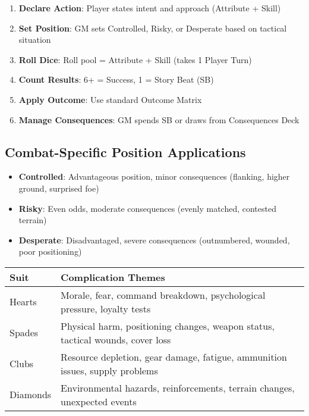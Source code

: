 \begin{enumerate}
    \item \textbf{Declare Action}: Player states intent and approach (Attribute + Skill)
    \item \textbf{Set Position}: GM sets Controlled, Risky, or Desperate based on tactical situation
    \item \textbf{Roll Dice}: Roll pool = Attribute + Skill (takes 1 Player Turn)
    \item \textbf{Count Results}: 6+ = Success, 1 = Story Beat (SB)
    \item \textbf{Apply Outcome}: Use standard Outcome Matrix
    \item \textbf{Manage Consequences}: GM spends SB or draws from Consequences Deck
\end{enumerate}

\subsection{Combat-Specific Position Applications}

\begin{itemize}
    \item \textbf{Controlled}: Advantageous position, minor consequences (flanking, higher ground, surprised foe)
    \item \textbf{Risky}: Even odds, moderate consequences (evenly matched, contested terrain)
    \item \textbf{Desperate}: Disadvantaged, severe consequences (outnumbered, wounded, poor positioning)
\end{itemize}

\begin{fatebox}
\begin{tabularx}{\textwidth}{lX}
\toprule
\textbf{Suit} & \textbf{Complication Themes} \\
\midrule
Hearts & Morale, fear, command breakdown, psychological pressure, loyalty tests \\
Spades & Physical harm, positioning changes, weapon status, tactical wounds, cover loss \\
Clubs & Resource depletion, gear damage, fatigue, ammunition issues, supply problems \\
Diamonds & Environmental hazards, reinforcements, terrain changes, unexpected events \\
\bottomrule
\end{tabularx}
\end{fatebox}

